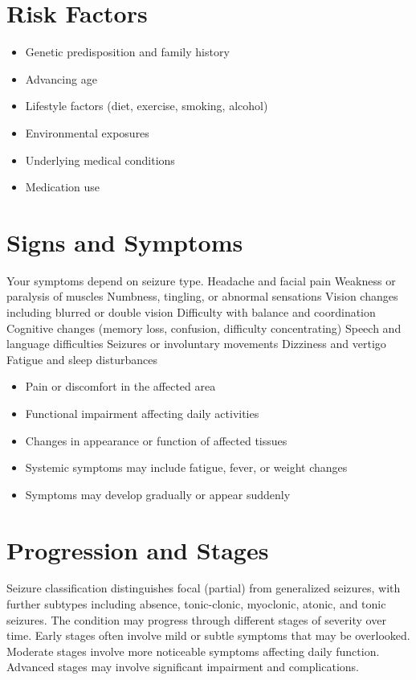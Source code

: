 \section{Risk Factors}
\begin{itemize}[noitemsep]
  \item Genetic predisposition and family history
  \item Advancing age
  \item Lifestyle factors (diet, exercise, smoking, alcohol)
  \item Environmental exposures
  \item Underlying medical conditions
  \item Medication use
\end{itemize}
\section{Signs and Symptoms}
Your symptoms depend on seizure type. Headache and facial pain Weakness or paralysis of muscles Numbness, tingling, or abnormal sensations Vision changes including blurred or double vision Difficulty with balance and coordination Cognitive changes (memory loss, confusion, difficulty concentrating) Speech and language difficulties Seizures or involuntary movements Dizziness and vertigo Fatigue and sleep disturbances

\begin{itemize}[noitemsep]
  \item Pain or discomfort in the affected area
  \item Functional impairment affecting daily activities
  \item Changes in appearance or function of affected tissues
  \item Systemic symptoms may include fatigue, fever, or weight changes
  \item Symptoms may develop gradually or appear suddenly
\end{itemize}
\section{Progression and Stages}
Seizure classification distinguishes focal (partial) from generalized seizures, with further subtypes including absence, tonic-clonic, myoclonic, atonic, and tonic seizures. The condition may progress through different stages of severity over time. Early stages often involve mild or subtle symptoms that may be overlooked. Moderate stages involve more noticeable symptoms affecting daily function. Advanced stages may involve significant impairment and complications.
